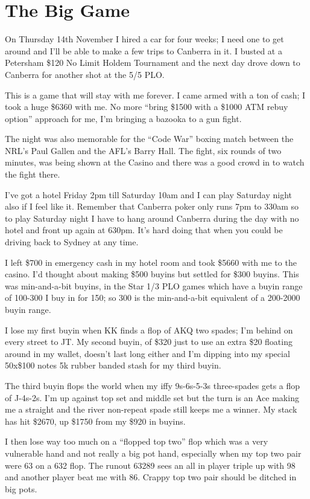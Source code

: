 \chapter{The Big Game}

On Thursday 14th November I hired a car for four weeks; I need one to
get around and I'll be able to make a few trips to Canberra in it. I
busted at a Petersham \$120 No Limit Holdem Tournament and the next
day drove down to Canberra for another shot at the 5/5 PLO.

This is a game that will stay with me forever. I came armed with a ton
of cash; I took a huge \$6360 with me. No more ``bring \$1500 with a
\$1000 ATM rebuy option'' approach for me, I'm bringing a bazooka to a
gun fight.

The night was also memorable for the ``Code War'' boxing match between
the NRL's Paul Gallen and the AFL's Barry Hall. The fight, six rounds
of two minutes, was being shown at the Casino and there was a good
crowd in to watch the fight there.

I've got a hotel Friday 2pm till Saturday 10am and I can play Saturday
night also if I feel like it. Remember that Canberra poker only runs
7pm to 330am so to play Saturday night I have to hang around Canberra
during the day with no hotel and front up again at 630pm. It's hard
doing that when you could be driving back to Sydney at any time.

I left \$700 in emergency cash in my hotel room and took \$5660 with
me to the casino. I'd thought about making \$500 buyins but settled
for \$300 buyins. This was min-and-a-bit buyins, in the Star 1/3 PLO
games which have a buyin range of 100-300 I buy in for 150; so 300 is
the min-and-a-bit equivalent of a 200-2000 buyin range.

I lose my first buyin when KK finds a flop of AKQ two spades; I'm
behind on every street to JT. My second buyin, of \$320 just to use an
extra \$20 floating around in my wallet, doesn't last long either and
I'm dipping into my special 50x\$100 notes 5k rubber banded stash for
my third buyin.

The third buyin flops the world when my iffy 9s-6s-5-3s three-spades gets a
flop of J-4s-2s. I'm up against top set and middle set but the turn is
an Ace making me a straight and the river non-repeat spade still keeps
me a winner. My stack has hit \$2670, up \$1750 from my \$920 in
buyins.

I then lose way too much on a ``flopped top two'' flop which was a
very vulnerable hand and not really a big pot hand, especially when my
top two pair were 63 on a 632 flop. The runout 63289 sees an all in
player triple up with 98 and another player beat me with 86. Crappy
top two pair should be ditched in big pots.

